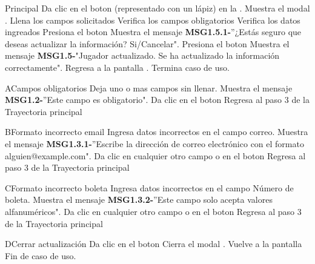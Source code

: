 	\newpage
	\begin{UCtrayectoria}{Principal}
	\UCpaso[\UCactor] Da clic en el boton  (representado con un lápiz) en la .
	\UCpaso Muestra el modal .
	\UCpaso[\UCactor] Llena los campos solicitados
	\UCpaso Verifica los campos obligatorios  
	\UCpaso Verifica los datos ingreados   
	\UCpaso[\UCactor] Presiona el boton  
	\UCpaso Muestra el mensaje {\bf MSG1.5.1-}''¿Estás seguro que deseas actualizar la información? Si/Cancelar".
	\UCpaso[\UCactor] Presiona el boton  
	\UCpaso Muestra el mensaje {\bf MSG1.5-}"Jugador actualizado. Se ha actualizado la información correctamente".
	\UCpaso Regresa a la pantalla .
	\UCpaso Termina caso de uso.
\end{UCtrayectoria}

\begin{UCtrayectoriaA}{A}{Campos obligatorios}
	\UCpaso[\UCactor] Deja uno o mas campos sin llenar.
	\UCpaso Muestra el mensaje {\bf MSG1.2-}''Este campo es obligatorio".
	\UCpaso[\UCactor] Da clic en el boton 
	\UCpaso Regresa al paso 3 de la Trayectoria principal
\end{UCtrayectoriaA}

\begin{UCtrayectoriaA}{B}{Formato incorrecto email}
	\UCpaso[\UCactor] Ingresa datos incorrectos en el campo correo.
	\UCpaso Muestra el mensaje {\bf MSG1.3.1-}''Escribe la dirección de correo electrónico con el formato alguien@example.com".
	\UCpaso[\UCactor] Da clic en cualquier otro campo o en el boton 
	\UCpaso Regresa al paso 3 de la Trayectoria principal
\end{UCtrayectoriaA}

\begin{UCtrayectoriaA}{C}{Formato incorrecto boleta}
	\UCpaso[\UCactor] Ingresa datos incorrectos en el campo Número de boleta.
	\UCpaso Muestra el mensaje {\bf MSG1.3.2-}''Este campo solo acepta valores alfanuméricos".
	\UCpaso[\UCactor] Da clic en cualquier otro campo o en el boton 
	\UCpaso Regresa al paso 3 de la Trayectoria principal
\end{UCtrayectoriaA}

\begin{UCtrayectoriaA}{D}{Cerrar actualización}
	\UCpaso[\UCactor] Da clic en el boton 
	\UCpaso Cierra el modal .
	\UCpaso Vuelve a la pantalla 
	\UCpaso Fin de caso de uso.
\end{UCtrayectoriaA}

